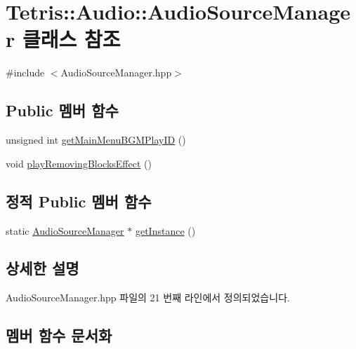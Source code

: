\hypertarget{class_tetris_1_1_audio_1_1_audio_source_manager}{}\section{Tetris\+:\+:Audio\+:\+:Audio\+Source\+Manager 클래스 참조}
\label{class_tetris_1_1_audio_1_1_audio_source_manager}


{\ttfamily \#include $<$Audio\+Source\+Manager.\+hpp$>$}

\subsection*{Public 멤버 함수}
\begin{DoxyCompactItemize}
\item 
unsigned int \hyperlink{class_tetris_1_1_audio_1_1_audio_source_manager_a64d6e7c7f0849d5de7cc26898079986c}{get\+Main\+Menu\+B\+G\+M\+Play\+ID} ()
\item 
void \hyperlink{class_tetris_1_1_audio_1_1_audio_source_manager_a44c761f0200291a2c8f282d8d52aa081}{play\+Removing\+Blocks\+Effect} ()
\end{DoxyCompactItemize}
\subsection*{정적 Public 멤버 함수}
\begin{DoxyCompactItemize}
\item 
static \hyperlink{class_tetris_1_1_audio_1_1_audio_source_manager}{Audio\+Source\+Manager} $\ast$ \hyperlink{class_tetris_1_1_audio_1_1_audio_source_manager_a561c580924ee6a13e6453b2d94764548}{get\+Instance} ()
\end{DoxyCompactItemize}


\subsection{상세한 설명}


Audio\+Source\+Manager.\+hpp 파일의 21 번째 라인에서 정의되었습니다.



\subsection{멤버 함수 문서화}
\mbox{\label{class_tetris_1_1_audio_1_1_audio_source_manager_a561c580924ee6a13e6453b2d94764548}} 
